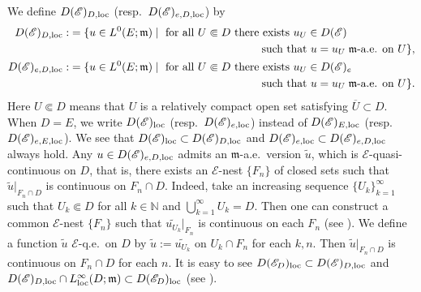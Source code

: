 \documentclass[12pt,a4paper]{article}
\newcommand{\m}{\mathfrak{m} }
\newcommand{\loc}{{\rm loc}}
\newcommand{\1}{{\bf 1}}
\begin{document}
We define $D(\mathscr{E})_{D,\loc}$ (resp.~$D(\mathscr{E})_{e,D,\loc}$) by
\begin{align*}
D(\mathscr{E})_{D,\loc}:&=\{u\in L^0(E;{\m})\mid \text{ for all }U\Subset D
\text{ there exists }u_U\in D(\mathscr{E})\\
&\hspace{6cm}
\text{ such that }u=u_U\;{\m}\text{-a.e. on }U\},\\
D(\mathscr{E})_{e,D,\loc}:&=\{u\in L^0(E;{\m})\mid \text{ for all }U\Subset D
\text{ there exists }u_U\in D(\mathscr{E})_e\\
&\hspace{6cm}
\text{ such that }u=u_U\;{\m}\text{-a.e. on }U\}.
\end{align*}
Here $U\Subset D$ means that $U$ is a relatively compact open set satisfying $\overline{U}\subset D$. When $D=E$, we write $D(\mathscr{E})_{\loc}$ (resp.~$D(\mathscr{E})_{e,\loc}$) instead of 
$D(\mathscr{E})_{E,\loc}$ (resp.~$D(\mathscr{E})_{e,E,\loc}$). We see that $D(\mathscr{E})_{\loc}\subset D(\mathscr{E})_{D,\loc}$ 
and $D(\mathscr{E})_{e,\loc}\subset D(\mathscr{E})_{e,D,\loc}$ always hold. 
 Any $u\in D(\mathscr{E})_{e,D,\loc}$ admits 
an ${\m}$-a.e.~version $\tilde{u}$, which is $\mathscr{E}$-quasi-continuous on $D$, that is, there exists an $\mathscr{E}$-nest $\{F_n\}$ of closed sets such that $\tilde{u}|_{F_n\cap D}$ is continuous on $F_n\cap D$. Indeed, take an increasing sequence $\{U_k\}_{k=1}^{\infty}$ 
such that $U_k\Subset D$ for all $k\in\mathbb{N}$ 
and $\bigcup_{k=1}^{\infty}U_k=D$. 
Then one can construct a common $\mathscr{E}$-nest $\{F_n\}$ such that  
$\widetilde{u_{U_k}}|_{F_n}$ is continuous on each $F_n$ (see \cite[Chapter III, Proposition~3.3]{MR}). 
We define a function $\tilde{u}$ $\mathscr{E}$-q.e.~on $D$   
by $\tilde{u}:=\widetilde{u_{U_k}}$ on $U_k\cap F_n$ for each $k,n$. 
Then $\tilde{u}|_{F_n\cap D}$ is  continuous on $F_n\cap D$ for each $n$. 
It is easy to see 
$D(\mathscr{E}_D)_{\loc}\subset D(\mathscr{E})_{D,\loc}$ and 
$D(\mathscr{E})_{D,\loc}\cap L_{\loc}^{\infty}(D;\m)\subset 
D(\mathscr{E}_D)_{\loc}$ (see \cite[pp.~1185]{CK}). 
\end{document}

